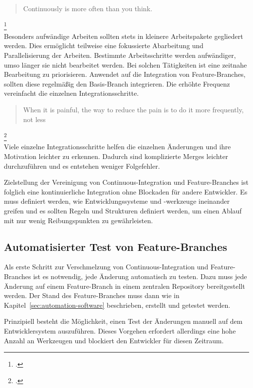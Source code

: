 \blockquote {Continuously is more often than you think.}\footcite[vgl.][Kap. Continuous Integration]{humble2010}\\

Besonders aufwändige Arbeiten sollten stets in kleinere Arbeitspakete gegliedert werden. Dies ermöglicht teilweise eine fokussierte Abarbeitung und Parallelisierung der Arbeiten. Bestimmte Arbeitsschritte werden aufwändiger, umso länger sie nicht bearbeitet werden. Bei solchen Tätigkeiten ist eine zeitnahe Bearbeitung zu priorisieren.
Anwendet auf die Integration von Feature-Branches, sollten diese regelmäßig den Basis-Branch integrieren. Die erhöhte Frequenz vereinfacht die einzelnen Integrationsschritte.\\

\blockquote {When it is painful, the way to reduce the pain is to do it more frequently, not less}\footcite[vgl.][S.24]{humble2010}\\

Viele einzelne Integrationsschritte helfen die einzelnen Änderungen und ihre Motivation leichter zu erkennen. Dadurch sind komplizierte Merges leichter durchzuführen und es entstehen weniger Folgefehler.
 
Zielstellung der Vereinigung von Continuous-Integration und Feature-Branches ist folglich eine kontinuierliche Integration ohne Blockaden für andere Entwickler. Es muss definiert werden, wie Entwicklungssysteme und -werkzeuge ineinander greifen und es sollten Regeln und Strukturen definiert werden, um einen Ablauf mit nur wenig Reibungspunkten zu gewährleisten.

\subsection{Automatisierter Test von Feature-Branches}

Als erste Schritt zur Verschmelzung von Continuous-Integration und Feature-Branches ist es notwendig, jede Änderung automatisch zu testen. Dazu muss jede Änderung auf einem Feature-Branch in einem zentralen Repository bereitgestellt werden. Der Stand des Feature-Branches muss dann wie in Kapitel~\ref{sec:automation-software}  beschrieben, erstellt und getestet werden.

Prinzipiell besteht die Möglichkeit, einen Test der Änderungen manuell auf dem Entwicklersystem auszuführen. Dieses Vorgehen erfordert allerdings eine hohe Anzahl an Werkzeugen und blockiert den Entwickler für diesen Zeitraum.

